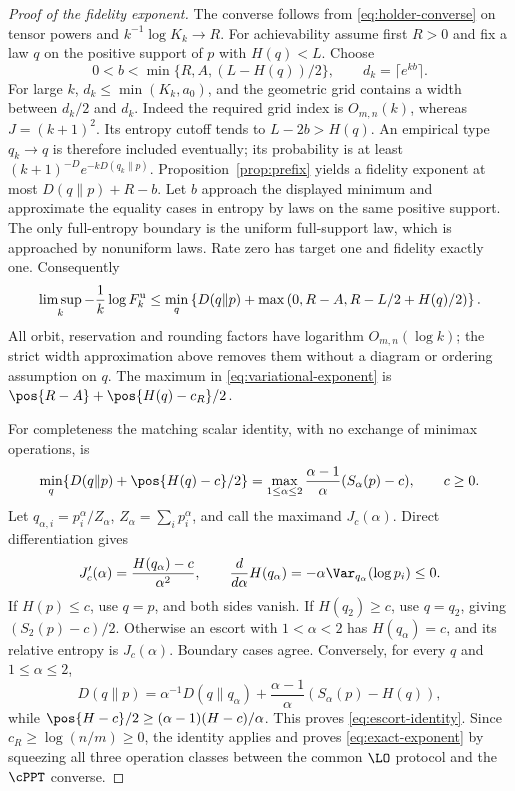 \begin{proof}[Proof of the fidelity exponent]
The converse follows from \eqref{eq:holder-converse} on tensor powers and $k^{-1}\log K_k\to R$. For achievability assume first $R>0$ and fix a law $q$ on the positive support of $p$ with $H(q)<L$. Choose
\[
 0<b<\min\{R,A,(L-H(q))/2\},\qquad d_k=\lceil e^{kb}\rceil.
\]
For large $k$, $d_k\le\min(K_k,a_0)$, and the geometric grid contains a width between $d_k/2$ and $d_k$. Indeed the required grid index is $O_{m,n}(k)$, whereas $J=(k+1)^2$. Its entropy cutoff tends to $L-2b>H(q)$. An empirical type $q_k\to q$ is therefore included eventually; its probability is at least $(k+1)^{-D}e^{-kD(q_k\|p)}$. Proposition~\ref{prop:prefix} yields a fidelity exponent at most $D(q\|p)+R-b$. Let $b$ approach the displayed minimum and approximate the equality cases in entropy by laws on the same positive support. The only full-entropy boundary is the uniform full-support law, which is approached by nonuniform laws. Rate zero has target one and fidelity exactly one. Consequently
\begin{equation}\label{eq:variational-exponent}
 \limsup_k-\frac1k\log F_k^{\rm u}
 \le\min_q\left\{D(q\|p)+\max\left(0,R-A,R-L/2+H(q)/2\right)\right\}.
\end{equation}
All orbit, reservation and rounding factors have logarithm $O_{m,n}(\log k)$; the strict width approximation above removes them without a diagram or ordering assumption on $q$. The maximum in \eqref{eq:variational-exponent} is $\pos{R-A}+\pos{H(q)-c_R}/2$.

For completeness the matching scalar identity, with no exchange of minimax operations, is
\begin{equation}\label{eq:escort-identity}
 \min_q\{D(q\|p)+\pos{H(q)-c}/2\}
 =\max_{1\le\alpha\le2}\frac{\alpha-1}{\alpha}(S_\alpha(p)-c),\qquad c\ge0.
\end{equation}
Let $q_{\alpha,i}=p_i^\alpha/Z_\alpha$, $Z_\alpha=\sum_i p_i^\alpha$, and call the maximand $J_c(\alpha)$. Direct differentiation gives
\[
 J'_c(\alpha)=\frac{H(q_\alpha)-c}{\alpha^2},\qquad
 \frac{d}{d\alpha}H(q_\alpha)=-\alpha\Var_{q_\alpha}(\log p_i)\le0.
\]
If $H(p)\le c$, use $q=p$, and both sides vanish. If $H(q_2)\ge c$, use $q=q_2$, giving $(S_2(p)-c)/2$. Otherwise an escort with $1<\alpha<2$ has $H(q_\alpha)=c$, and its relative entropy is $J_c(\alpha)$. Boundary cases agree. Conversely, for every $q$ and $1\le\alpha\le2$,
\[
 D(q\|p)=\alpha^{-1}D(q\|q_\alpha)
 +\frac{\alpha-1}{\alpha}(S_\alpha(p)-H(q)),
\]
while $\pos{H-c}/2\ge(\alpha-1)(H-c)/\alpha$. This proves \eqref{eq:escort-identity}. Since $c_R\ge\log(n/m)\ge0$, the identity applies and proves \eqref{eq:exact-exponent} by squeezing all three operation classes between the common $\LO$ protocol and the $\cPPT$ converse.
\end{proof}

